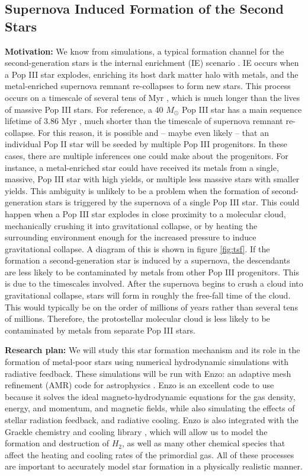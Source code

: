 \documentclass[letterpaper, 12pt]{article}
\begin{document}
\subsection{Supernova Induced Formation of the Second Stars}
\label{sec:tsf}

\textbf{Motivation:} We know from simulations, a typical formation channel for the second-generation stars is the internal enrichment (IE) scenario \citep{Chiaki2019}. IE occurs when a Pop III star explodes, enriching its host dark matter halo with metals, and the metal-enriched supernova remnant re-collapses to form new stars. This process occurs on a timescale of several tens of Myr \citep{Chiaki2019}, which is much longer than the lives of massive Pop III stars. For reference, a 40 $M_\odot$ Pop III star has a main sequence lifetime of 3.86 Myr \citep{Schaerer2002}, much shorter than the timescale of supernova remnant re-collapse. For this reason, it is possible and -- maybe even likely -- that an individual Pop II star will be seeded by multiple Pop III progenitors. In these cases, there are multiple inferences one could make about the progenitors. For instance, a metal-enriched star could have received its metals from a single, massive, Pop III star with high yields, or multiple less massive stars with smaller yields. This ambiguity is unlikely to be a problem when the formation of second-generation stars is triggered by the supernova of a single Pop III star. This could happen when a Pop III star explodes in close proximity to a molecular cloud, mechanically crushing it into gravitational collapse, or by heating the surrounding environment enough for the increased pressure to induce gravitational collapse. A diagram of this is shown in figure \ref{fig:tsf}. If the formation a second-generation star is induced by a supernova, the descendants are less likely to be contaminated by metals from other Pop III progenitors. This is due to the timescales involved. After the supernova begins to crush a cloud into gravitational collapse, stars will form in roughly the free-fall time of the cloud. This would typically be on the order of millions of years rather than several tens of millions. Therefore, the protostellar molecular cloud is less likely to be contaminated by metals from separate Pop III stars. 

\textbf{Research plan:} We will study this star formation mechanism and its role in the formation of metal-poor stars using numerical hydrodynamic simulations with radiative feedback. These simulations will be run with Enzo: an adaptive mesh refinement (AMR) code for astrophysics \citep{Bryan2014}. Enzo is an excellent code to use because it solves the ideal magneto-hydrodynamic equations for the gas density, energy, and momentum, and magnetic fields, while also simulating the effects of stellar radiation feedback, and radiative cooling. Enzo is also integrated with the Grackle chemistry and cooling library \citep{Smith2017}, which will allow us to model the formation and destruction of $H_2$, as well as many other chemical species that affect the heating and cooling rates of the primordial gas. All of these processes are important to accurately model star formation in a physically realistic manner. 
\end{document}
